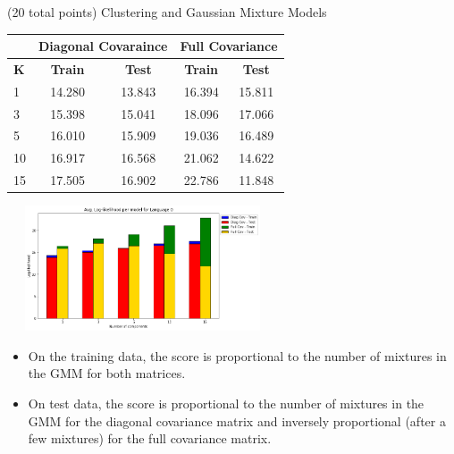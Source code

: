 \documentclass[12pt]{article}
\begin{document}
\begin{question}{(20 total points) Clustering and Gaussian Mixture Models}
\begin{subquestion}
      \begin{answerbox}{30em}
        \begin{center}
            \begin{tabular}{l|c|c|c|c|}
                \cline{2-5}
                 & \multicolumn{2}{c|}{\textbf{Diagonal Covaraince}} & \multicolumn{2}{c|}{\textbf{Full Covariance}} \\ \hline
                \multicolumn{1}{|l|}{\textbf{K}} & \textbf{Train}           & \textbf{Test}          & \textbf{Train}         & \textbf{Test}        \\ \hline
                \multicolumn{1}{|l|}{1}  & 14.280 & 13.843 & 16.394 & 15.811 \\ \hline
                \multicolumn{1}{|l|}{3}  & 15.398 & 15.041 & 18.096 & 17.066 \\ \hline
                \multicolumn{1}{|l|}{5}  & 16.010 & 15.909 & 19.036 & 16.489 \\ \hline
                \multicolumn{1}{|l|}{10} & 16.917 & 16.568 & 21.062 & 14.622 \\ \hline
                \multicolumn{1}{|l|}{15} & 17.505 & 16.902 & 22.786 & 11.848 \\ \hline
            \end{tabular}
        \end{center}
         \begin{center}
             \includegraphics[width=0.6\textwidth, height=10em]{results/3_5.png}
         \end{center}
         \begin{itemize}
             \item On the training data, the score is proportional to the number of mixtures in the GMM for both matrices.
             \item On test data, the score is proportional to the number of mixtures in the GMM for the diagonal covariance matrix and inversely proportional (after a few mixtures) for the full covariance matrix.
         \end{itemize}
    \end{answerbox}
  


   \end{subquestion}

   
\end{question}
\end{document}
